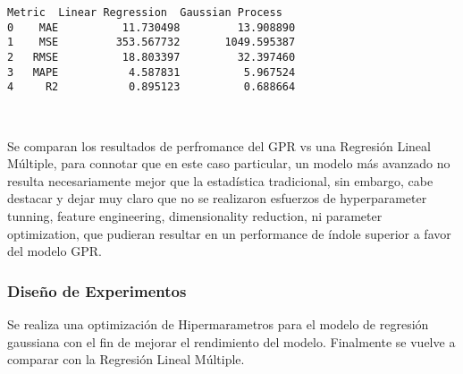 \documentclass[11pt]{article}
\begin{document}
    \begin{Verbatim}[commandchars=\\\{\}]
  Metric  Linear Regression  Gaussian Process
0    MAE          11.730498         13.908890
1    MSE         353.567732       1049.595387
2   RMSE          18.803397         32.397460
3   MAPE           4.587831          5.967524
4     R2           0.895123          0.688664
    \end{Verbatim}

    \begin{center}
    \end{center}
    { \hspace*{\fill} \\}
    
    Se comparan los resultados de perfromance del GPR vs una Regresión
Lineal Múltiple, para connotar que en este caso particular, un modelo
más avanzado no resulta necesariamente mejor que la estadística
tradicional, sin embargo, cabe destacar y dejar muy claro que no se
realizaron esfuerzos de hyperparameter tunning, feature engineering,
dimensionality reduction, ni parameter optimization, que pudieran
resultar en un performance de índole superior a favor del modelo GPR.

    \subsubsection{Diseño de Experimentos}\label{diseuxf1o-de-experimentos}

    Se realiza una optimización de Hipermarametros para el modelo de
regresión gaussiana con el fin de mejorar el rendimiento del modelo.
Finalmente se vuelve a comparar con la Regresión Lineal Múltiple.
\end{document}
